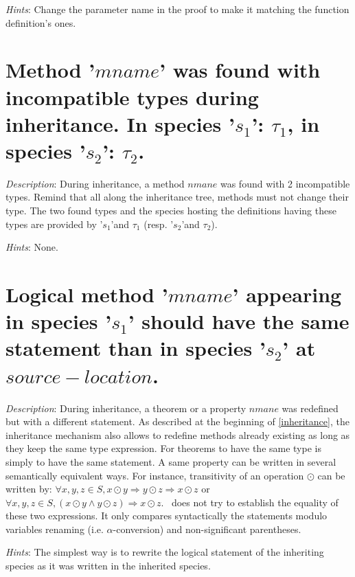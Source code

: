{\em Hints}: Change the parameter name in the proof to make it
matching the function definition's ones.



\section*{Method '$mname$' was found with incompatible types during
  inheritance. In species '$s_1$': $\tau_1$, in species '$s_2$':
  $\tau_2$.}

{\em Description}: During inheritance, a method $nmane$ was found with
2 incompatible types. Remind that all along the inheritance tree,
methods must not change their type. The two found types and the
species hosting the definitions having these types are provided by
'$s_1$'and $\tau_1$ (resp. '$s_2$'and $\tau_2$).

{\em Hints}: None.



\section*{Logical method '$mname$' appearing in species '$s_1$' should
  have the same statement than in species '$s_2$' at
  $source-location$.}

{\em Description}: During inheritance, a theorem or a property $nmane$
was redefined but with a different statement. As described at the
beginning of \ref{inheritance}, the inheritance mechanism also allows
to redefine methods already existing as long as they keep the same
type expression.  For theorems to have the same type is simply to have
the same statement. A same property can be written in several
semantically equivalent ways. For instance, transitivity of an
operation $\odot$ can be written by:
$\forall x, y, z \in S, x \odot y \Rightarrow y \odot z \Rightarrow
x \odot z$
or
$\forall x, y, z \in S, (x \odot y \wedge y \odot z) \Rightarrow
x \odot z$.
\focal\ does not try to establish the equality of these two
expressions. It only compares syntactically the statements modulo
variables renaming (i.e. $\alpha$-conversion) and non-significant
parentheses.

{\em Hints}: The simplest way is to rewrite the logical statement of
the inheriting species as it was written in the inherited species.



